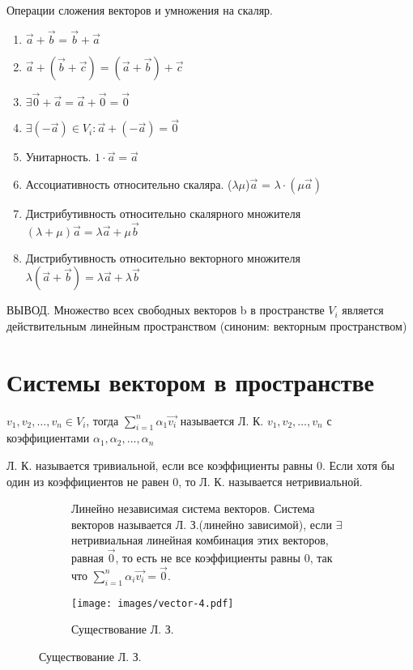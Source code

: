 \begin{theorem}
	Операции сложения векторов и умножения на скаляр.
	\begin{enumerate}
		\item \(\vec{a}+\vec{b} = \vec{b} + \vec{a}\)
		\item \(\vec{a}+(\vec{b} + \vec{c}) = (\vec{a}+\vec{b}) + \vec{c}\)
		\item \(\exists \vec{0}+\vec{a} = \vec{a}+\vec{0} = \vec{0}\)
		\item \(\exists (-\vec{a}) \in V_i: \vec{a} + (-\vec{a}) = \vec{0}\)
		\item Унитарность. \(1\cdot \vec{a} = \vec{a}\)
		\item Ассоциативность относительно скаляра. (\(\lambda\mu\))$\vec{a}$ = \(\lambda\cdot(\mu\vec{a})\)
		\item Дистрибутивность относительно скалярного множителя \((\lambda + \mu)\vec{a} = \lambda\vec{a}+\mu\vec{b}\)
		\item Дистрибутивность относительно векторного множителя \(\lambda(\vec{a} + \vec{b}) = \lambda \vec{a} + \lambda \vec{b}\)
	\end{enumerate}			
	ВЫВОД. Множество всех свободных векторов b в пространстве \(V_i\) является действительным линейным пространством (синоним: векторным пространством) \\
\end{theorem}
\section{Системы вектором в пространстве }
\begin{definition}
	\(v_1, v_2,\ldots, v_n\in V_i \), тогда \(\sum_{i=1}^{n}\alpha_1\vec{v_i}\) называется Л. К. \(v_1, v_2, \ldots, v_n\) с коэффициентами $\alpha_1, \alpha_2, \ldots, \alpha_n$
\end{definition}
Л. К. называется тривиальной, если все коэффициенты равны 0. Если хотя бы один из коэффициентов не равен 0, то Л. К. называется нетривиальной.
\begin{figure}[h]
	\begin{subfigure}[t!]{0.6\linewidth}
			\begin{definition}
			Линейно независимая система векторов. Система векторов называется Л. З.(линейно зависимой), если $\exists$ нетривиальная линейная комбинация этих векторов, равная $\vec{0}$, то есть не все коэффициенты равны 0, так что \(\sum_{i=1}^{n}\alpha_i\vec{v_i} = \vec{0}\).
		\end{definition}
	\end{subfigure}
	\begin{subfigure}[b!]{0.4\linewidth}
		\centering
		\texttt{[image: images/vector-4.pdf]}
		\caption*{Существование Л. З.}
		\label{Vector4}
	\end{subfigure}
\end{figure}

